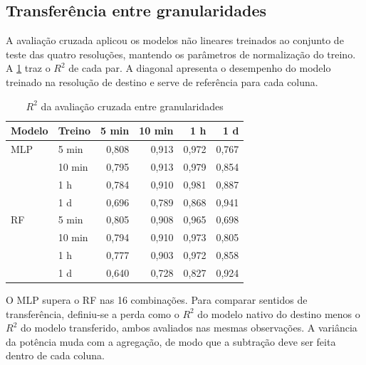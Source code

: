 \subsection{Transferência entre granularidades}
\label{sec:resultados-cruzada}

A avaliação cruzada aplicou os modelos não lineares treinados ao conjunto de
teste das quatro resoluções, mantendo os parâmetros de normalização do
treino. A \cref{tab:resultados-cruzada} traz o $R^2$ de cada par. A diagonal
apresenta o desempenho do modelo treinado na resolução de destino e serve de
referência para cada coluna.

\begin{table}[htbp]
    \centering
    \small
    \caption{$R^2$ da avaliação cruzada entre granularidades}
    \label{tab:resultados-cruzada}
    \begin{tabular}{llrrrr}
        \toprule
        Modelo & Treino & 5 min & 10 min & 1 h & 1 d \\
        \midrule
        MLP & 5 min  & 0,808 & 0,913 & 0,972 & 0,767 \\
            & 10 min & 0,795 & 0,913 & 0,979 & 0,854 \\
            & 1 h    & 0,784 & 0,910 & 0,981 & 0,887 \\
            & 1 d    & 0,696 & 0,789 & 0,868 & 0,941 \\
        \midrule
        RF  & 5 min  & 0,805 & 0,908 & 0,965 & 0,698 \\
            & 10 min & 0,794 & 0,910 & 0,973 & 0,805 \\
            & 1 h    & 0,777 & 0,903 & 0,972 & 0,858 \\
            & 1 d    & 0,640 & 0,728 & 0,827 & 0,924 \\
        \bottomrule
    \end{tabular}
\end{table}

O MLP supera o RF nas 16 combinações. Para comparar sentidos de
transferência, definiu-se a perda como o $R^2$ do modelo nativo do destino
menos o $R^2$ do modelo transferido, ambos avaliados nas mesmas observações.
A variância da potência muda com a agregação, de modo que a subtração deve
ser feita dentro de cada coluna.

